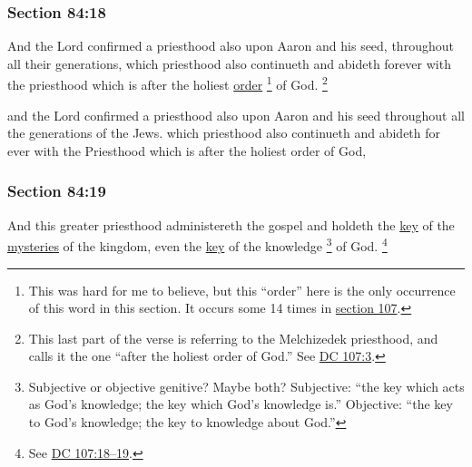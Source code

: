 
	\subsubsection{Section 84:18} %
		\label{DC84-18}

		And the Lord confirmed a priesthood also upon Aaron and his seed, throughout all their generations, which priesthood also continueth and abideth forever with the priesthood which is after the holiest \hyperref[ORDER]{order}%
			\footnote{%
				This was hard for me to believe, but this ``order'' here is the only occurrence of this word in this section. It occurs some 14 times in \hyperref[DC107]{section 107}.
				}
		of God.%
			\footnote{%
				This last part of the verse is referring to the Melchizedek priesthood, and calls it the one ``after the holiest order of God.'' See \hyperref[DC107-3]{DC 107:3}.
				}

		\begin{framed}
		\scriptsize
			\begin{compactdesc}
				\item[JSP] and the Lord confirmed a priesthood also upon Aaron and his seed throughout all the generations of the Jews. which priesthood also continueth and abideth for ever with the Priesthood which is after the holiest order of God, 
			\end{compactdesc}
		\end{framed}

	\subsubsection{Section 84:19} %
		\label{DC84-19}

		And this greater priesthood administereth the gospel and holdeth the \hyperref[KEY]{key} of the \hyperref[MYSTERY]{mysteries} of the kingdom, even the \hyperref[KEY]{key} of the knowledge%
			\footnote{%
				Subjective or objective genitive? Maybe both? Subjective: ``the key which acts as God's knowledge; the key which God's knowledge is.'' Objective: ``the key to God's knowledge; the key to knowledge about God.''
				}
		of God.%
			\footnote{%
				See \hyperref[DC107-18]{DC 107:18--19}.
				}


